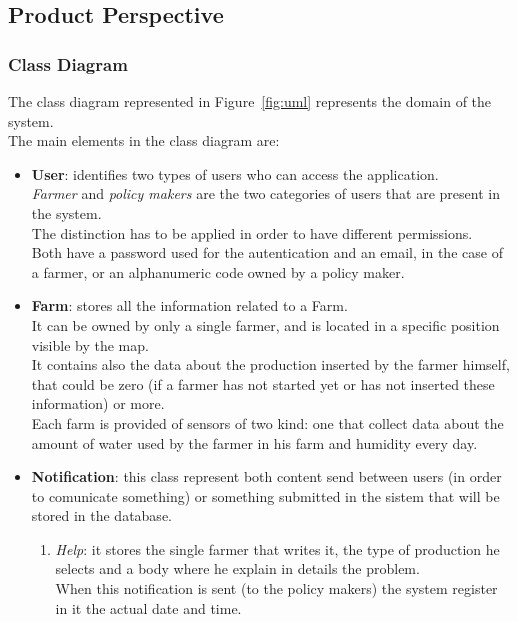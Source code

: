 \subsection{Product Perspective}
\subsubsection{Class Diagram}
The class diagram represented in Figure~\ref{fig:uml} represents the domain of the system. \\
The main elements in the class diagram are:
\begin{itemize}
    \item \textbf{User}: identifies two types of users who can access the application.\\
    \textsl{Farmer} and \textsl{policy makers} are the two categories of users that are present in the system. \\
    The distinction has to be applied in order to have different permissions.\\
    Both have a password used for the autentication and an email, in the case of a farmer, or an alphanumeric code owned by a policy maker.
    \item \textbf{Farm}: stores all the information related to a Farm.\\ 
    It can be owned by only a single farmer, and is located in a specific position visible by the map. \\
    It contains also the data about the production inserted by the farmer himself, that could be zero (if a farmer has not started yet or has not inserted these information) or more.\\
    Each farm is provided of sensors of two kind: one that collect data about the amount of water used by the farmer in his farm and humidity every day.\\
    \item \textbf{Notification}: this class represent both content send between users (in order to comunicate something) or something submitted in the sistem that will be stored in the database.\\
        \begin{enumerate}
            \item \textsl{Help}: it stores the single farmer that writes it, the type of production he selects and a body where he explain in details the problem.\\When this notification is sent (to the policy makers) the system register in it the actual date and time.

\end{enumerate}
\end{itemize}
